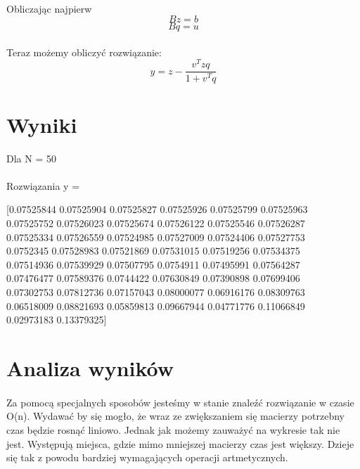 \documentclass{article}
\begin{document}
\paragraph{}
Obliczając najpierw
 \begin{equation*}
Bz = b 
\end{equation*}
\begin{equation*}
Bq = u
\end{equation*}
\paragraph{}
Teraz możemy obliczyć rozwiązanie:
 \begin{equation*}
 y =    z - \frac{v^{T}zq}{1+v^{T}q}
\end{equation*}


\pagebreak
\section{Wyniki}



Dla N = 50 
\paragraph{}
Rozwiązania y = 

[0.07525844 0.07525904 0.07525827 0.07525926 0.07525799 0.07525963 \\
 0.07525752 0.07526023 0.07525674 0.07526122 0.07525546 0.07526287 \\
 0.07525334 0.07526559 0.07524985 0.07527009 0.07524406 0.07527753 \\
 0.0752345  0.07528983 0.07521869 0.07531015 0.07519256 0.07534375 \\
 0.07514936 0.07539929 0.07507795 0.0754911  0.07495991 0.07564287 \\
 0.07476477 0.07589376 0.0744422  0.07630849 0.07390898 0.07699406 \\
 0.07302753 0.07812736 0.07157043 0.08000077 0.06916176 0.08309763 \\
 0.06518009 0.08821693 0.05859813 0.09667944 0.04771776 0.11066849 \\
 0.02973183 0.13379325] 

\begin{center}

\end{center}

\pagebreak

\section{Analiza wyników}
\paragraph{}
Za pomocą specjalnych sposobów jesteśmy w stanie znaleźć rozwiązanie w czasie O(n).
Wydawać by się mogło, że wraz ze zwiększaniem się macierzy potrzebny czas będzie  rosnąć liniowo.
Jednak jak możemy zauważyć na wykresie tak nie jest. Występują miejsca, gdzie mimo mniejszej macierzy 
czas jest większy. Dzieje się tak z powodu bardziej wymagających operacji artmetycznych.
\end{document}

